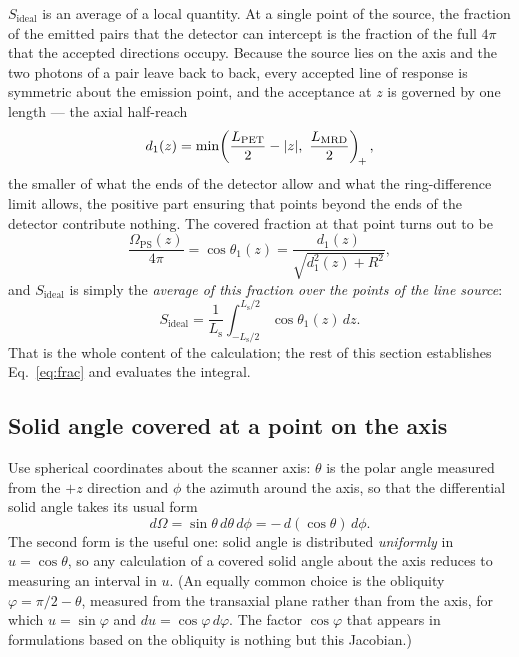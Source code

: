 \documentclass[11pt,a4paper]{article}
\newcommand{\Lpet}{L_{\mathrm{PET}}}
\newcommand{\Lsrc}{L_{\mathrm{s}}}
\newcommand{\Lmrd}{L_{\mathrm{MRD}}}
\newcommand{\Sid}{S_{\mathrm{ideal}}}
\DeclarePairedDelimiter{\abs}{\lvert}{\rvert}
\begin{document}
$\Sid$ is an average of a local quantity. At a single point of the source, the fraction of
the emitted pairs that the detector can intercept is the fraction of the full $4\pi$ that
the accepted directions occupy. Because the source lies on the axis and the two photons of
a pair leave back to back, every accepted line of response is symmetric about the emission
point, and the acceptance at $z$ is governed by one length --- the axial half-reach
\begin{equation}
  d_1(z)=\min\!\left(\frac{\Lpet}{2}-\abs{z},\ \frac{\Lmrd}{2}\right)_{\!+} ,
  \label{eq:d1app}
\end{equation}
the smaller of what the ends of the detector allow and what the ring-difference limit
allows, the positive part ensuring that points beyond the ends of the detector contribute
nothing. The covered fraction at that point turns out to be
\begin{equation}
  \frac{\Omega_{\mathrm{PS}}(z)}{4\pi}=\cos\theta_1(z)=\frac{d_1(z)}{\sqrt{d_1^2(z)+R^2}} ,
  \label{eq:frac}
\end{equation}
and $\Sid$ is simply the \emph{average of this fraction over the points of the line
source}:
\begin{equation}
  \Sid=\frac{1}{\Lsrc}\int_{-\Lsrc/2}^{\Lsrc/2}\cos\theta_1(z)\,dz .
  \label{eq:Sid}
\end{equation}
That is the whole content of the calculation; the rest of this section establishes
Eq.~\eqref{eq:frac} and evaluates the integral.

\subsection{Solid angle covered at a point on the axis}
\label{sec:omega}

Use spherical coordinates about the scanner axis: $\theta$ is the polar angle measured from
the $+z$ direction and $\phi$ the azimuth around the axis, so that the differential solid
angle takes its usual form
\begin{equation}
  d\Omega=\sin\theta\,d\theta\,d\phi=-\,d(\cos\theta)\,d\phi .
  \label{eq:dOmega}
\end{equation}
The second form is the useful one: solid angle is distributed \emph{uniformly} in
$u=\cos\theta$, so any calculation of a covered solid angle about the axis reduces to
measuring an interval in $u$. (An equally common choice is the obliquity
$\varphi=\pi/2-\theta$, measured from the transaxial plane rather than from the axis, for
which $u=\sin\varphi$ and $du=\cos\varphi\,d\varphi$. The factor $\cos\varphi$ that appears
in formulations based on the obliquity is nothing but this Jacobian.)
\end{document}
